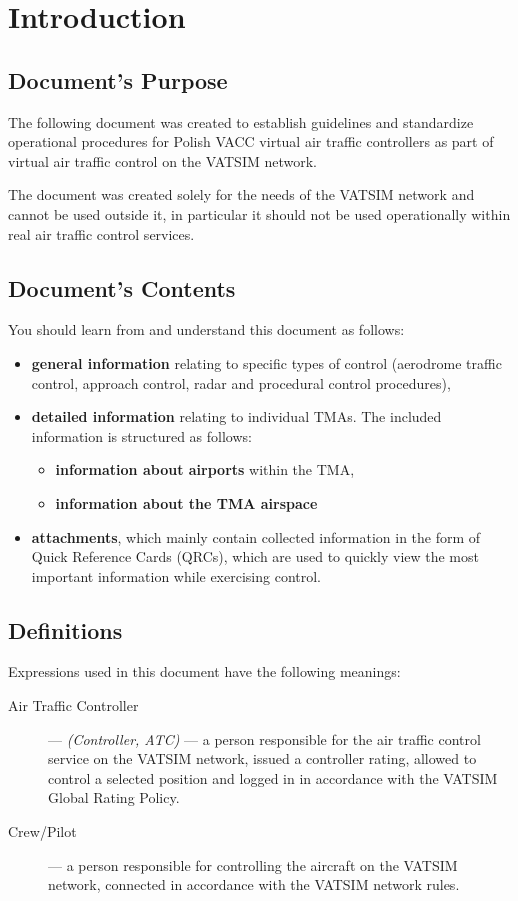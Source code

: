 \chapter{Introduction}%
\label{ch:introduction}
\section{Document's Purpose}
The following document was created to establish guidelines and standardize operational procedures for Polish VACC virtual air traffic controllers as part of virtual air traffic control on the VATSIM network.

The document was created solely for the needs of the VATSIM network and cannot be used outside it, in particular it should not be used operationally within real air traffic control services.

\section{Document's Contents}
You should learn from and understand this document as follows:
\begin{itemize}
\item \textbf{general information} relating to specific types of control (aerodrome traffic control, approach control, radar and procedural control procedures),
\item \textbf{detailed information} relating to individual TMAs. The included information is structured as follows:
\begin{itemize}
\item \textbf{information about airports} within the TMA,
\item \textbf{information about the TMA airspace}
\end{itemize}
\item \textbf{attachments}, which mainly contain collected information in the form of Quick Reference Cards (QRCs), which are used to quickly view the most important information while exercising control.
\end{itemize}

\section{Definitions}
Expressions used in this document have the following meanings:
\begin{description}
    \item[Air Traffic Controller] --- \textit{(Controller, ATC)} --- a person responsible for the air traffic control service on the VATSIM network, issued a controller rating, allowed to control a selected position and logged in in accordance with the VATSIM Global Rating Policy.
    \item[Crew/Pilot] --- a person responsible for controlling the aircraft on the VATSIM network, connected in accordance with the VATSIM network rules.
\end{description}

